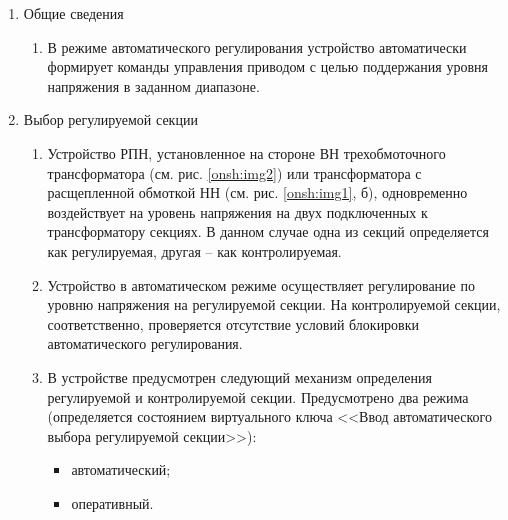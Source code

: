 
\color{black}

\begin{enumerate}


\item Общие сведения

\begin{enumerate}

\item В режиме автоматического регулирования устройство автоматически формирует команды управления приводом с целью поддержания уровня напряжения в заданном диапазоне.


\end{enumerate}


\item Выбор регулируемой секции

\begin{enumerate}
\item 
Устройство РПН, установленное на стороне ВН трехобмоточного трансформатора (см. рис. \ref{onsh:img2}) или трансформатора с расщепленной обмоткой  НН (см. рис. \ref{onsh:img1}, б), одновременно воздействует на уровень напряжения на двух подключенных к трансформатору секциях. В данном случае одна из секций определяется как регулируемая, другая -- как контролируемая.
\item
Устройство в автоматическом режиме осуществляет регулирование по уровню напряжения на регулируемой секции. На контролируемой секции, соответственно, проверяется отсутствие условий блокировки автоматического регулирования.
\item
В устройстве предусмотрен следующий механизм определения регулируемой и контролируемой секции. Предусмотрено два режима (определяется состоянием виртуального ключа <<Ввод автоматического выбора регулируемой секции>>):
\begin{itemize}
    \item автоматический;
    \item оперативный.
\end{itemize}


\end{enumerate}
\end{enumerate}
